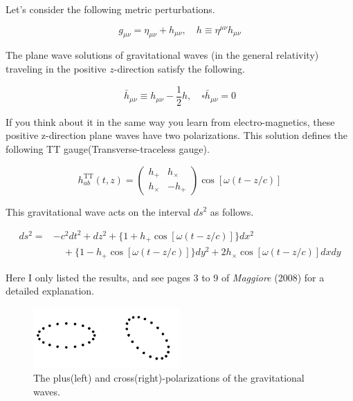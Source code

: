 \begin{example}
Let's consider the following metric perturbations.

\begin{equation}
    g_{\mu \nu} = \eta_{\mu \nu} + h_{\mu \nu}, \quad h \equiv \eta^{\mu \nu}h_{\mu \nu}
\end{equation}

The plane wave solutions of gravitational waves (in the general relativity) traveling in the positive $z$-direction satisfy the following.

\begin{equation}
    \bar{h}_{\mu \nu} \equiv h_{\mu \nu} - \frac{1}{2} h, \quad \square \bar{h}_{\mu \nu} = 0 
\end{equation}

If you think about it in the same way you learn from electro-magnetics, these positive z-direction plane waves have two polarizations. This solution defines the following TT gauge(Transverse-traceless gauge).

\begin{equation}
    h_{ab}^{\mathrm{TT}}(t,z) = \begin{pmatrix} h_+ & h_\times \\ h_\times & -h_+ \end{pmatrix} \cos{[\omega(t-z/c)]}
\end{equation}

This gravitational wave acts on the interval $ds^2$ as follows.

\begin{align}
    \nonumber ds^2 = &-c^2 dt^2 + dz^2 + \{ 1 + h_+ \cos{[\omega(t-z/c)]}\} dx^2 \\
    &\quad + \{ 1 - h_+ \cos{[\omega(t-z/c)]} \} dy^2 + 2h_\times \cos{[\omega(t-z/c)]} dxdy
\end{align}

Here I only listed the results, and see pages 3 to 9 of \textit{Maggiore} (2008) for a detailed explanation.
\end{example}

\begin{figure}[h]
\centering
\includegraphics[width=0.5\textwidth]{figs/pol.png}
\caption{The plus(left) and cross(right)-polarizations of the gravitational waves.}
\end{figure}

